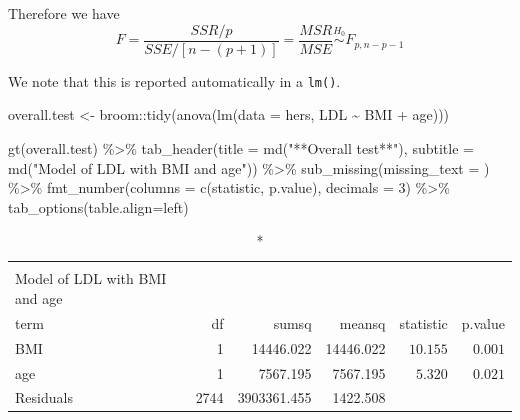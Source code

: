 \documentclass[
  letterpaper,
  DIV=11,
  numbers=noendperiod]{scrreport}
\newenvironment{Shaded}{\begin{snugshade}}{\end{snugshade}}
\newcommand{\AttributeTok}[1]{\textcolor[rgb]{0.40,0.45,0.13}{#1}}
\newcommand{\DecValTok}[1]{\textcolor[rgb]{0.68,0.00,0.00}{#1}}
\newcommand{\FunctionTok}[1]{\textcolor[rgb]{0.28,0.35,0.67}{#1}}
\newcommand{\NormalTok}[1]{\textcolor[rgb]{0.00,0.23,0.31}{#1}}
\newcommand{\OtherTok}[1]{\textcolor[rgb]{0.00,0.23,0.31}{#1}}
\newcommand{\SpecialCharTok}[1]{\textcolor[rgb]{0.37,0.37,0.37}{#1}}
\newcommand{\StringTok}[1]{\textcolor[rgb]{0.13,0.47,0.30}{#1}}
\begin{document}
Therefore we have
\[F = \frac{SSR/p}{SSE/[n-(p+1)]} = \frac{MSR}{MSE} \stackrel{H_0}{\sim} F_{p,n-p-1}\]

We note that this is reported automatically in a \texttt{lm()}.

\begin{Shaded}
\begin{Highlighting}[]
\NormalTok{overall.test }\OtherTok{\textless{}{-}}\NormalTok{ broom}\SpecialCharTok{::}\FunctionTok{tidy}\NormalTok{(}\FunctionTok{anova}\NormalTok{(}\FunctionTok{lm}\NormalTok{(}\AttributeTok{data =}\NormalTok{ hers, LDL }\SpecialCharTok{\textasciitilde{}}\NormalTok{ BMI }\SpecialCharTok{+}\NormalTok{ age)))}

\FunctionTok{gt}\NormalTok{(overall.test) }\SpecialCharTok{\%\textgreater{}\%} 
  \FunctionTok{tab\_header}\NormalTok{(}\AttributeTok{title =} \FunctionTok{md}\NormalTok{(}\StringTok{"**Overall test**"}\NormalTok{),}
             \AttributeTok{subtitle =} \FunctionTok{md}\NormalTok{(}\StringTok{"Model of LDL with BMI and age"}\NormalTok{)) }\SpecialCharTok{\%\textgreater{}\%} 
  \FunctionTok{sub\_missing}\NormalTok{(}\AttributeTok{missing\_text =} \StringTok{\textquotesingle{}\textquotesingle{}}\NormalTok{) }\SpecialCharTok{\%\textgreater{}\%} 
  \FunctionTok{fmt\_number}\NormalTok{(}\AttributeTok{columns =} \FunctionTok{c}\NormalTok{(}\StringTok{\textquotesingle{}statistic\textquotesingle{}}\NormalTok{, }\StringTok{\textquotesingle{}p.value\textquotesingle{}}\NormalTok{), }\AttributeTok{decimals =} \DecValTok{3}\NormalTok{) }\SpecialCharTok{\%\textgreater{}\%} 
  \FunctionTok{tab\_options}\NormalTok{(}\AttributeTok{table.align=}\StringTok{\textquotesingle{}left\textquotesingle{}}\NormalTok{)}
\end{Highlighting}
\end{Shaded}

\begin{longtable}{lrrrrr}
\caption*{
{\large \textbf{Overall test}} \\ 
{\small Model of LDL with BMI and age}
} \\ 
\toprule
term & df & sumsq & meansq & statistic & p.value \\ 
\midrule
BMI & 1 & 14446.022 & 14446.022 & $10.155$ & $0.001$ \\ 
age & 1 & 7567.195 & 7567.195 & $5.320$ & $0.021$ \\ 
Residuals & 2744 & 3903361.455 & 1422.508 &  &  \\ 
\bottomrule
\end{longtable}
\end{document}
